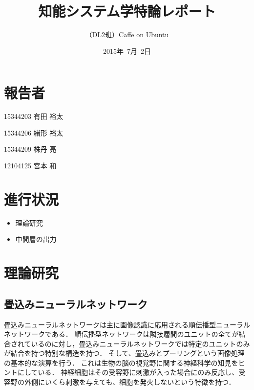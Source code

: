 \documentclass[a4paper,10pt]{jsarticle}
\title{知能システム学特論レポート}
\author{
（DL2班）Caffe on Ubuntu\\
}
\date{2015年\ 7月\ 2日}
\begin{document}
\maketitle
\section{報告者}
\begin{list}{}{}
 \item 15344203\hspace{0.5cm} 有田 裕太
 \item 15344206\hspace{0.5cm} 緒形 裕太
 \item 15344209\hspace{0.5cm} 株丹 亮
 \item 12104125\hspace{0.5cm} 宮本 和
\end{list}

\section{進行状況}

\begin{itemize}
\item 理論研究
\item 中間層の出力
\end{itemize}

\section{理論研究}
\subsection{畳込みニューラルネットワーク}
畳込みニューラルネットワークは主に画像認識に応用される順伝播型ニューラルネットワークである．
順伝播型ネットワークは隣接層間のユニットの全てが結合されているのに対し，畳込みニューラルネットワークでは特定のユニットのみが結合を持つ特別な構造を持つ．
そして、畳込みとプーリングという画像処理の基本的な演算を行う．
これは生物の脳の視覚野に関する神経科学の知見をヒントにしている．
神経細胞はその受容野に刺激が入った場合にのみ反応し、受容野の外側にいくら刺激を与えても、細胞を発火しないという特徴を持つ．
\end{document}
